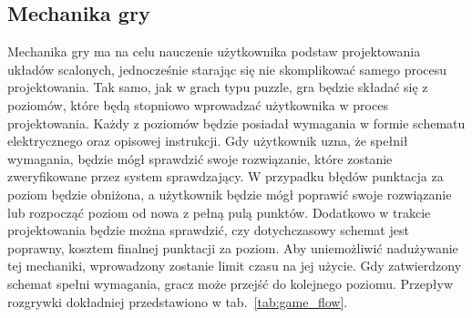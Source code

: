 
\subsection{Mechanika gry}
\label{subsec:mechanika_gry}

Mechanika gry ma na celu nauczenie użytkownika podstaw projektowania układów scalonych,
jednocześnie starając się nie skomplikować samego procesu projektowania.
Tak samo, jak w grach typu puzzle, gra będzie składać się z poziomów,
które będą stopniowo wprowadzać użytkownika w proces projektowania.
Każdy z poziomów będzie posiadał wymagania w formie schematu elektrycznego oraz opisowej instrukcji.
Gdy użytkownik uzna, że spełnił wymagania, będzie mógł sprawdzić swoje rozwiązanie,
które zostanie zweryfikowane przez system sprawdzający.
W przypadku błędów punktacja za poziom będzie obniżona,
a użytkownik będzie mógł poprawić swoje rozwiązanie lub rozpocząć poziom od nowa z pełną pulą punktów.
Dodatkowo w trakcie projektowania będzie można sprawdzić, czy dotychczasowy schemat jest poprawny,
kosztem finalnej punktacji za poziom.
Aby uniemożliwić nadużywanie tej mechaniki, wprowadzony zostanie limit czasu na jej użycie.
Gdy zatwierdzony schemat spełni wymagania, gracz może przejść do kolejnego poziomu.
Przepływ rozgrywki dokładniej przedstawiono w tab.~\ref{tab:game_flow}.


